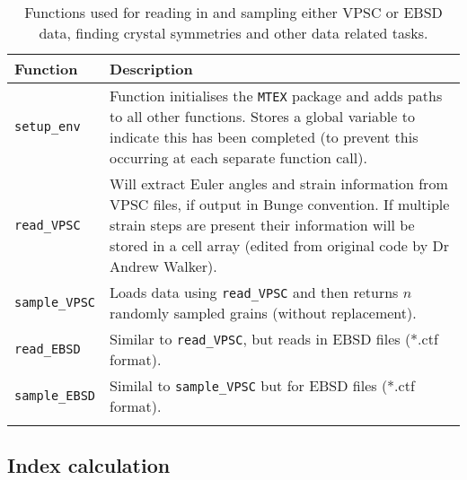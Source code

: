 \documentclass[a4paper,12pt]{report}
\numberwithin{equation}{chapter}
\begin{document}
\begin{table}[h!] 
	\centering
	\caption[Functions: reading \& sampling]{Functions used for reading in and sampling either VPSC or EBSD data, finding crystal symmetries and other data related tasks.}
	\noindent
	
\begin{tabularx}{\textwidth}{lX}

\hline
\hline
Function    & Description   \\ 
\hline
\hline

\texttt{setup\_{}env} & Function initialises the \texttt{MTEX} package and adds paths to all other functions. Stores a global variable to indicate this has been completed (to prevent this occurring at each separate function call). \\  

\texttt{read\_{}VPSC} & Will extract Euler angles and strain information from VPSC files, if output in Bunge convention. If multiple strain steps are present their information will be stored in a cell array (edited from original code by Dr Andrew Walker). \\ 

\texttt{sample\_{}VPSC} & Loads data using \texttt{read\_{}VPSC} and then returns $n$ randomly sampled grains (without replacement). \\  

\texttt{read\_{}EBSD} & Similar to \texttt{read\_{}VPSC}, but reads in EBSD files (*.ctf format). \\

\texttt{sample\_{}EBSD} & Similal to \texttt{sample\_{}VPSC} but for EBSD files (*.ctf format). \\ 
\\
\hline
\hline

\end{tabularx}
\label{tab:read_functions}
\end{table}

\subsection{Index calculation} \label{sec:index_calc}
\end{document}
